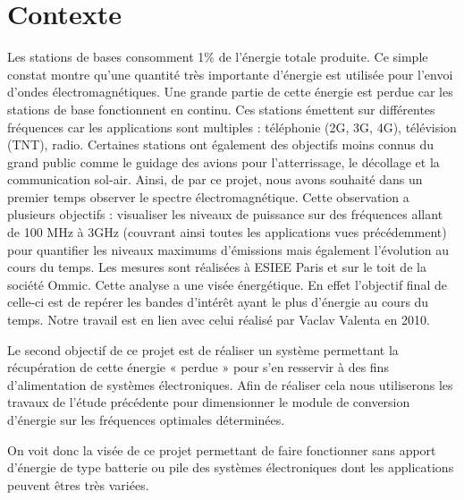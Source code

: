 \part{Contexte}
Les stations de bases consomment 1\% de l’énergie totale produite.
Ce simple constat montre qu’une quantité très importante d’énergie est utilisée pour l’envoi d’ondes électromagnétiques.
Une grande partie de cette énergie est perdue car les stations de base fonctionnent en continu.
Ces stations émettent sur différentes fréquences car les applications sont multiples :
    téléphonie (2G, 3G, 4G),
    télévision (TNT),
    radio.
Certaines stations ont également des objectifs moins connus du grand public comme le guidage des avions pour l’atterrissage,
    le décollage et la communication sol-air.
Ainsi, de par ce projet, nous avons souhaité dans un premier temps observer le spectre électromagnétique.
Cette observation a plusieurs objectifs : visualiser les niveaux de puissance
    sur des fréquences allant de 100 MHz à 3GHz
    (couvrant ainsi toutes les applications vues précédemment)
    pour quantifier les niveaux maximums d’émissions mais également l’évolution au cours du temps.
Les mesures sont réalisées à ESIEE Paris et sur le toit de la société Ommic. Cette analyse a une visée énergétique.
En effet l’objectif final de celle-ci est de repérer les bandes d’intérêt ayant le plus d’énergie au cours du temps.
Notre travail est en lien avec celui réalisé par Vaclav Valenta en 2010.




Le second objectif de ce projet est de réaliser un système permettant
    la récupération de cette énergie « perdue » pour s’en resservir à des fins d’alimentation de systèmes électroniques.
    Afin de réaliser cela nous utiliserons les travaux de l’étude précédente pour dimensionner
    le module de conversion d’énergie sur les fréquences optimales déterminées.


On voit donc la visée de ce projet permettant de faire fonctionner
    sans apport d’énergie de type batterie ou pile des
    systèmes électroniques dont les applications peuvent êtres très variées.


\newpage